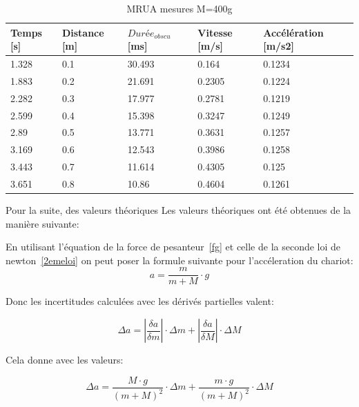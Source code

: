 \begin{table}[ht]
    \centering
    \caption[MRUA mesures M=400g]{MRUA mesures M=400g}
    \begin{tabular}{|l|l|l|l|l|}
	\hline
	Temps [s]	&Distance [m]	&$Durée_{obscu}$ [ms]	&Vitesse [m/s]	&Accélération [m/s2]\\
	\hline
	1.328	&0.1	&30.493	&0.164	&0.1234 \\
	1.883	&0.2	&21.691	&0.2305	&0.1224 \\
	2.282	&0.3	&17.977	&0.2781	&0.1219 \\
	2.599	&0.4	&15.398	&0.3247	&0.1249 \\
	2.89	&0.5	&13.771	&0.3631	&0.1257 \\
	3.169	&0.6	&12.543	&0.3986	&0.1258 \\
	3.443	&0.7	&11.614	&0.4305	&0.125  \\
	3.651	&0.8	&10.86	&0.4604	&0.1261 \\
	\hline
    \end{tabular}
\end{table}

\newpage

Pour la suite, des valeurs théoriques 
Les valeurs théoriques ont été obtenues de la manière suivante:

En utilisant l'équation de la force de pesanteur~\eqref{fg} et celle de la seconde loi de newton~\eqref{2emeloi} on peut poser la formule suivante pour l'accéleration du chariot:
\begin{equation}
    a = \frac{m}{m + M} \cdot g
\end{equation}

Donc les incertitudes calculées avec les dérivés partielles valent:

\begin{equation}
    \Delta a = |\frac{\delta a}{\delta m}| \cdot \Delta m + |\frac{\delta a}{\delta M}| \cdot \Delta M
\end{equation}

Cela donne avec les valeurs:

\begin{equation}
    \Delta a = \frac{M \cdot g}{(m+M)^2} \cdot \Delta m + \frac{m \cdot g}{(m+M)^2} \cdot \Delta M
\end{equation}


